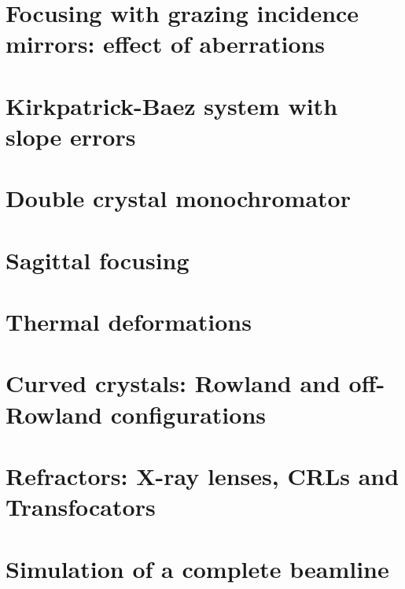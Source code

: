 \documentclass[12pt,a4paper]{article}
\begin{document}
\newpage
\section{Focusing with grazing incidence mirrors: effect of aberrations}



\newpage
\section{Kirkpatrick-Baez system with slope errors}



\newpage
\section{Double crystal monochromator}



\newpage
\section{Sagittal focusing}



\newpage
\section{Thermal deformations}



\newpage
\section{Curved crystals: Rowland and off-Rowland configurations}



\newpage
\section{Refractors: X-ray lenses, CRLs and Transfocators}



\newpage
\section{Simulation of a complete beamline}




\end{document}

